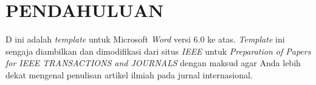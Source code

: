 \section{PENDAHULUAN}
\lettrine[lines=2, lraise=-0, nindent=0pt, findent=-1pt]
{\fontsize{24pt}{25.2pt}\selectfont D}{} ini adalah \textit{template} untuk Microsoft \textit{Word} versi 6.0 ke atas. \textit{Template} ini sengaja diambilkan dan dimodifikasi dari situs \textit{IEEE} untuk \textit{Preparation of Papers for IEEE TRANSACTIONS and JOURNALS} dengan maksud agar Anda lebih dekat mengenal penulisan artikel ilmiah pada jurnal internasional.\cite{1}